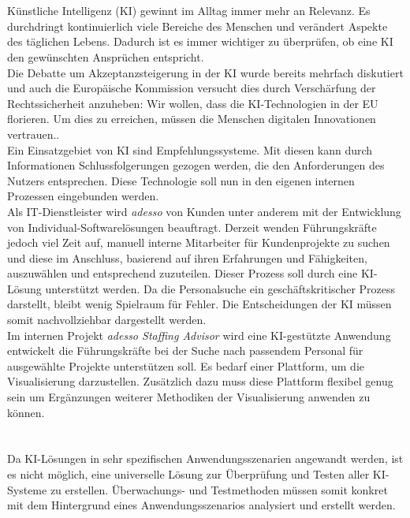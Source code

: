 \documentclass[a4paper,12pt]{scrreprt}
\newcommand{\hiddenchapter}[1]{
	\stepcounter{chapter}
	\chapter*{\arabic{chapter}\hspace{1em}{#1}}
}
\begin{document}
\pagestyle{empty}



\setcounter{page}{1}
\pagestyle{plain}

\hiddenchapter{Motivation}
Künstliche Intelligenz (KI) gewinnt im Alltag immer mehr an Relevanz. Es durchdringt kontinuierlich viele Bereiche des Menschen und verändert Aspekte des täglichen Lebens. Dadurch ist es immer wichtiger zu überprüfen, ob eine KI den gewünschten Ansprüchen entspricht\cite{pannu2015artificial}. \\

Die Debatte um Akzeptanzsteigerung in der KI wurde bereits mehrfach diskutiert und auch die Europäische Kommission versucht dies durch Verschärfung der Rechtssicherheit anzuheben: \glqq Wir wollen, dass die KI-Technologien in der EU florieren. Um dies zu erreichen, müssen die Menschen digitalen Innovationen vertrauen.\grqq{}\cite{kieuregelung}.\\

Ein Einsatzgebiet von KI sind Empfehlungssysteme. Mit diesen kann durch Informationen Schlussfolgerungen gezogen werden, die den Anforderungen des Nutzers entsprechen\cite{burke2000knowledge}. Diese Technologie soll nun in den eigenen internen Prozessen eingebunden werden. \\

Als IT-Dienstleister wird \emph{adesso} von Kunden unter anderem mit der Entwicklung von Individual-Softwarelösungen beauftragt. Derzeit wenden Führungskräfte jedoch viel Zeit auf, manuell interne Mitarbeiter für Kundenprojekte zu suchen und diese im Anschluss, basierend auf ihren Erfahrungen und Fähigkeiten, auszuwählen und entsprechend zuzuteilen. Dieser Prozess soll durch eine KI-Lösung unterstützt werden. Da die Personalsuche ein geschäftskritischer Prozess darstellt, bleibt wenig Spielraum für Fehler. Die Entscheidungen der KI müssen somit nachvollziehbar dargestellt werden. \\

Im internen Projekt \emph{adesso Staffing Advisor} wird eine KI-gestützte Anwendung entwickelt die Führungskräfte bei der Suche nach passendem Personal für ausgewählte Projekte unterstützen soll. Es bedarf einer Plattform, um die Visualisierung darzustellen. Zusätzlich dazu muss diese Plattform flexibel genug sein um Ergänzungen weiterer Methodiken der Visualisierung anwenden zu können.
\newpage

\hiddenchapter{Problemstellung}
Da KI-Lösungen in sehr spezifischen Anwendungsszenarien angewandt werden, ist es nicht möglich, eine universelle Lösung zur Überprüfung und Testen aller KI-Systeme zu erstellen. Überwachungs- und Testmethoden müssen somit konkret mit dem Hintergrund eines Anwendungsszenarios analysiert und erstellt werden. \\
\end{document}
